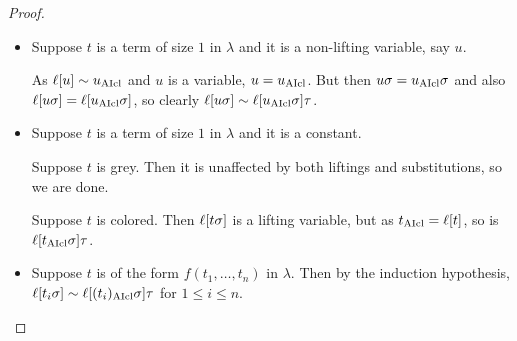 \documentclass[,%
	paper=a4,%
	DIV14, %
	twoside=false,%
	liststotoc,
	bibtotoc,
	draft=false,%
	numbers=noendperiod
]{scrartcl}
\begin{document}
\begin{proof}
\begin{itemize}
\begin{comment}
				As by the induction hypothesis $t\fromclause \sim \lifboth{t}$, $t\fromclause =z_j$ for some $j$.
				Hence, $\lifboth{t\cl\sigma} = t\cl$.
				By the remark on~$\tau$,
				$\lifboth{t\sigma} \sim \lifboth{t\cl\sigma}\tau$.
			\end{comment}

		\item Suppose $t$ is a term of size $1$ in $\lambda$ and it is a non-lifting variable, say $u$.

			As $\ell[u]\sim u_{\operatorname{AIcl}}$ and $u$ is a variable, $u = u_{\operatorname{AIcl}}$.
			But then $u\sigma = u_{\operatorname{AIcl}}\sigma$ and also $\ell[u \sigma] = \ell[u_{\operatorname{AIcl}}\sigma]$, so clearly 
			$\ell[u\sigma] \sim \ell[u_{\operatorname{AIcl}}\sigma]\tau$.



		\item Suppose $t$ is a term of size $1$ in $\lambda$ and it is a constant.

			Suppose $t$ is grey. Then it is unaffected by both liftings and substitutions, so we are done.

			Suppose $t$ is colored.
			Then $\ell[t\sigma]$ is a lifting variable, but 
			as $t_{\operatorname{AIcl}} = \ell[t]$, so is $\ell[t_{\operatorname{AIcl}}\sigma]\tau$.



		\item Suppose $t$ is of the form $f(t_{1}, \dotsc, t_{n})$ in $\lambda$.
			Then by the induction hypothesis, $\ell[t_{i}\sigma] \sim \ell[(t_{i})_{\operatorname{AIcl}}\sigma]\tau$ for $1 \leq i \leq n$.
\end{itemize}
\end{proof}
\end{document}
